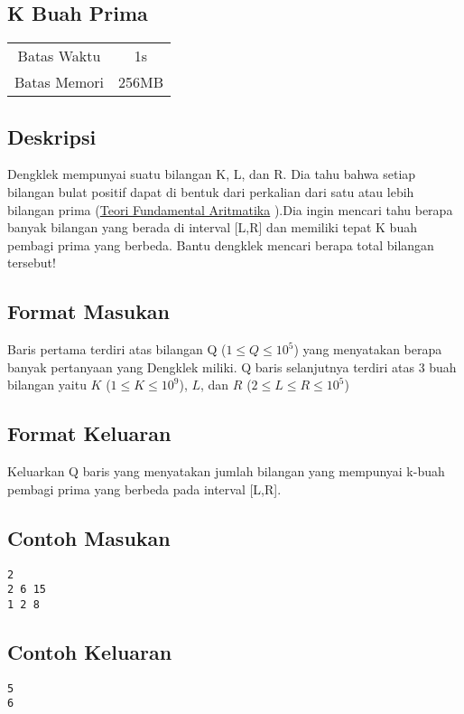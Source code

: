 \documentclass{article}
\begin{document}
\begin{center}

    
    \section*{K Buah Prima} %

    \begin{tabular}{ | c c | }
        \hline
        Batas Waktu  & 1s \\    %
        Batas Memori & 256MB \\  %
        \hline
    \end{tabular}
\end{center}

\subsection*{Deskripsi}
Dengklek mempunyai suatu bilangan K, L, dan R. Dia tahu bahwa setiap bilangan bulat positif dapat di bentuk dari perkalian dari satu atau lebih bilangan prima (\href{https://mathworld.wolfram.com/FundamentalTheoremofArithmetic.html}{Teori Fundamental Aritmatika} ).Dia ingin mencari tahu berapa banyak bilangan yang berada di interval [L,R] dan memiliki tepat K buah pembagi prima yang berbeda. Bantu dengklek mencari berapa total bilangan tersebut!

\subsection*{Format Masukan}

Baris pertama terdiri atas bilangan Q ($1 \leq Q \leq 10^5$) yang menyatakan berapa banyak pertanyaan yang Dengklek miliki.
Q baris selanjutnya terdiri atas 3 buah bilangan yaitu $K$ ($1 \leq K \leq 10^9$), $L$, dan $R$ ($2 \leq L \leq R \leq 10^5$)

\subsection*{Format Keluaran}

Keluarkan Q baris yang menyatakan jumlah bilangan yang mempunyai k-buah pembagi prima yang berbeda pada interval [L,R].
\\

\begin{multicols}{2}
\subsection*{Contoh Masukan}
\begin{lstlisting}
2
2 6 15
1 2 8
\end{lstlisting}
\columnbreak
\subsection*{Contoh Keluaran}
\begin{lstlisting}
5
6
\end{lstlisting}
\vfill
\null
\end{multicols}
\end{document}
